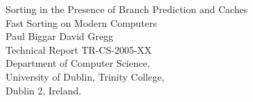 \documentclass{report}
\begin{document}
\begin{titlepage}
       \begin{center}
				\vspace*{40mm}
                \Huge Sorting in the Presence of Branch Prediction and Caches\\
                \vspace{1em}
                \Large Fast Sorting on Modern Computers\\
                \vspace{2em}
                \Large Paul Biggar \hspace{1cm} David Gregg\\
				\vspace{2em}
				\large Technical Report TR-CS-2005-XX\\
                \large Department of Computer Science,\\
				\large University of Dublin, Trinity College,\\
				\large Dublin 2, Ireland.
        \end{center}
\end{titlepage}
\end{document}
